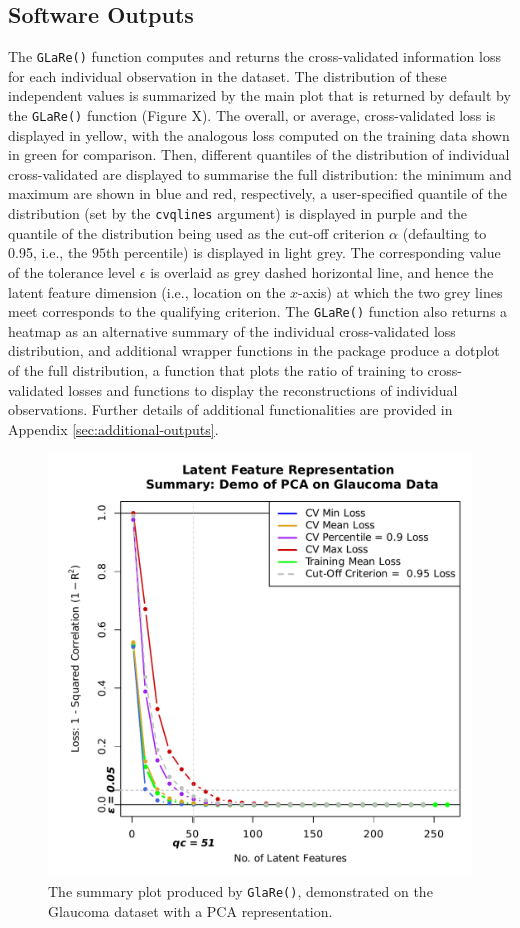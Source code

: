 \subsection{Software Outputs}

The \texttt{GLaRe()} function computes and returns the cross-validated information loss for each individual observation in the dataset.
The distribution of these independent values is summarized by the main plot that is returned by default by the \texttt{GLaRe()} function (Figure {\color{red}X}).
The overall, or average, cross-validated loss is displayed in yellow, with the analogous loss computed on the training data shown in green for comparison.
Then, different quantiles of the distribution of individual cross-validated are displayed to summarise the full distribution: the minimum and maximum are shown in blue and red, respectively, a user-specified quantile of the distribution (set by the \texttt{cvqlines} argument) is displayed in purple and the quantile of the distribution being used as the cut-off criterion $\alpha$ (defaulting to 0.95, i.e., the $95$th percentile) is displayed in light grey.
The corresponding value of the tolerance level $\epsilon$ is overlaid as grey dashed horizontal line, and hence the latent feature dimension (i.e., location on the $x$-axis) at which the two grey lines meet corresponds to the qualifying criterion.
The \texttt{GLaRe()} function also returns a heatmap as an alternative summary of the individual cross-validated loss distribution, and additional wrapper functions in the package produce a dotplot of the full distribution, a function that plots the ratio of training to cross-validated losses and functions to display the reconstructions of individual observations. Further details of additional functionalities are provided in Appendix \ref{sec:additional-outputs}.

\begin{figure}
    \centering
    \includegraphics[width=0.5\linewidth]{figures/glare-anatomy-plot.pdf}
    \caption{The summary plot produced by \texttt{GlaRe()}, demonstrated on the Glaucoma dataset with a PCA representation.}
    \label{fig:glare-anatomy-plot}
\end{figure}
